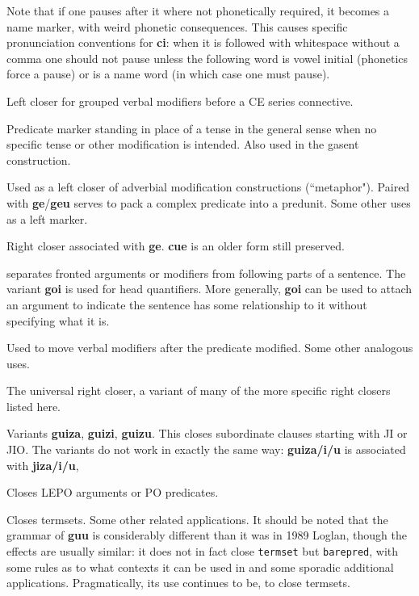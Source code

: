 \documentclass[12pt]{book}
\begin{document}
{\begin{description}
Note that if one pauses after it where not phonetically required, it becomes a name marker, with weird phonetic consequences.  This causes specific pronunciation conventions for {\bf ci}:  when it is followed with whitespace without a comma one should not pause unless the following word is vowel initial (phonetics force a pause) or is a name word (in which case one must pause).

 \item[cui:]  Left closer for grouped verbal modifiers before a CE series connective.

\item[ga:]   Predicate marker standing in place of a tense in the general sense when no specific tense or other modification is intended.  Also used in the gasent construction.

\item[ge:]   Used as a left closer of adverbial modification constructions (``metaphor").  Paired with {\bf ge}/{\bf geu} serves to pack a complex predicate into a predunit.  Some other uses as a left marker.

\item[geu (cue):]   Right closer associated with {\bf ge}.  {\bf cue} is an older form still preserved.

\item[gi:]  separates fronted arguments or modifiers from following parts of a sentence.  The variant {\bf goi} is used for head quantifiers.  More generally, {\bf goi} can be used to attach an argument to indicate the sentence has some relationship to it without specifying what it is.

\item[go:]  Used to move verbal modifiers after the predicate modified.  Some other analogous uses.

\item[gu:]  The universal right closer, a variant of many of the more specific right closers listed here.

\item[gui:]  Variants {\bf guiza}, {\bf guizi}, {\bf guizu}.  This closes subordinate clauses starting with JI or JIO.
The variants do not work in exactly the same way:  {\bf guiza/i/u} is associated with {\bf jiza/i/u},

\item[guo:]  Closes LEPO arguments or PO predicates.

\item[guu:]  Closes termsets.  Some other related applications.  It should be noted that the grammar of {\bf guu} is considerably different than it was in 1989 Loglan, though the effects are usually similar:  it does not in fact close {\tt termset} but {\tt barepred}, with some rules as to what contexts it can be used in and some sporadic additional applications.
Pragmatically, its use continues to be, to close termsets.


\end{description}}
\end{document}
